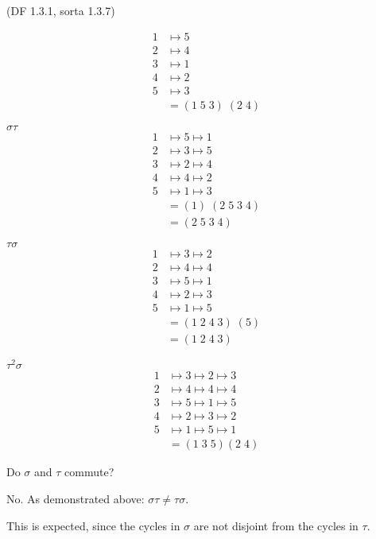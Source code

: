 \begin{problem}{\textsf{(DF 1.3.1, sorta 1.3.7)}}
\begin{enumalph}
\begin{Answer}
\begin{enumroman}
\begin{align*}
        1 &\mapsto 5 \\
        2 &\mapsto 4 \\
        3 &\mapsto 1 \\
        4 &\mapsto 2 \\
        5 &\mapsto 3 \\
        &= (1\; 5\;3)\; (2\;4)
      \end{align*}
      \item $\sigma\tau$
      \begin{align*}
        1 &\mapsto 5 \mapsto 1 \\
        2 &\mapsto 3 \mapsto 5 \\
        3 &\mapsto 2 \mapsto 4 \\
        4 &\mapsto 4 \mapsto 2 \\
        5 &\mapsto 1 \mapsto 3 \\
        &= (1)\; (2\;5\;3\;4) \\
        &= (2\;5\;3\;4)
      \end{align*}
      \item $\tau\sigma$
      \begin{align*}
        1 &\mapsto 3 \mapsto 2 \\
        2 &\mapsto 4 \mapsto 4 \\
        3 &\mapsto 5 \mapsto 1 \\
        4 &\mapsto 2 \mapsto 3 \\
        5 &\mapsto 1 \mapsto 5 \\
        &= (1\;2\;4\;3)\; (5)\\
        &= (1\;2\;4\;3)
      \end{align*}
      \item $\tau^2\sigma$
      \begin{align*}
        1 &\mapsto 3 \mapsto 2 \mapsto 3 \\
        2 &\mapsto 4 \mapsto 4 \mapsto 4 \\
        3 &\mapsto 5 \mapsto 1 \mapsto 5 \\
        4 &\mapsto 2 \mapsto 3 \mapsto 2 \\
        5 &\mapsto 1 \mapsto 5 \mapsto 1 \\
        &= (1\;3\;5) (2\;4)
      \end{align*}
      \item Do $\sigma$ and $\tau$ commute?
      
      No. As demonstrated above: $\sigma\tau \neq \tau\sigma$.
      
      \noindent This is expected, since the cycles in $\sigma$ are not disjoint
      from the cycles in $\tau$.


\end{enumroman}
\end{Answer}
\end{enumalph}
\end{problem}
